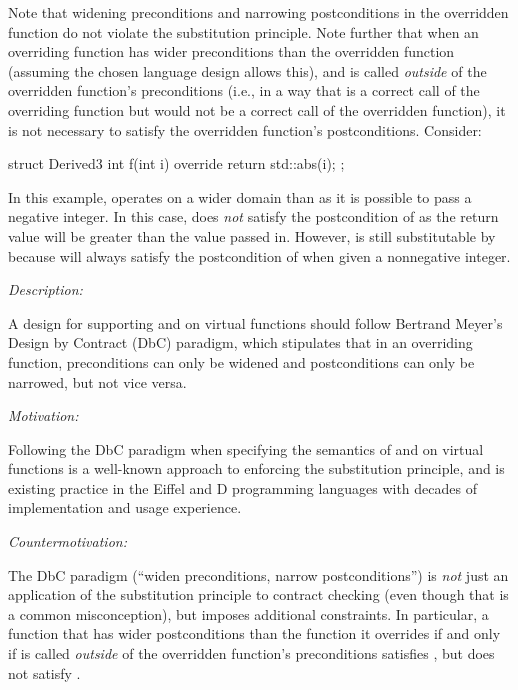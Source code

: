 
Note that widening preconditions and narrowing postconditions in the overridden function do not violate the substitution principle. Note further that when an overriding function has wider preconditions than the overridden function (assuming the chosen language design allows this), and is called \emph{outside} of the overridden function's preconditions (i.e., in a way that is a correct call of the overriding function but would not be a correct call of the overridden function), it is not necessary to satisfy the overridden function's postconditions. Consider:

\begin{codeblock}
struct Derived3 {
  int f(int i) override {
    return std::abs(i);
  }
};
\end{codeblock}
In this example,  operates on a wider domain than  as it is possible to pass a negative integer. In this case,   does \emph{not} satisfy the postcondition of  as the return value will be greater than the value passed in. However,  is still substitutable by  because  will always satisfy the postcondition of  when given a nonnegative integer.


\emph{Description:}

A design for supporting  and  on virtual functions should follow Bertrand Meyer's Design by Contract (DbC) paradigm, which stipulates that in an overriding function, preconditions can only be widened and postconditions can only be narrowed, but not vice versa.

\emph{Motivation:}

Following the DbC paradigm when  specifying the semantics of  and  on virtual functions is a well-known approach to enforcing the substitution principle, and is existing practice in the Eiffel and D programming languages with decades of implementation and usage experience.

\emph{Countermotivation:} 

The DbC paradigm (``widen preconditions, narrow postconditions'') is \emph{not} just an application of the substitution principle to contract checking (even though that is a common misconception), but imposes additional constraints. In particular, a function that has wider postconditions than the function it overrides if and only if is called \emph{outside} of the overridden function's preconditions satisfies , but does not satisfy . 

